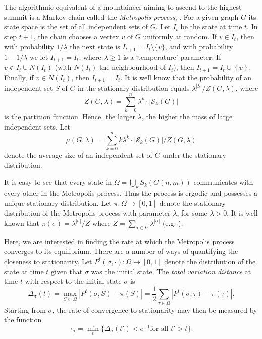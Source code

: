 \documentclass[a4paper,10pt]{article}
\newcommand\cS{\mathcal{S}}
\newcommand\cbc[1]{\left\{{#1}\right\}}
\newcommand\abs[1]{\left|{#1}\right|}
\begin{document}
The algorithmic equivalent of a mountaineer aiming to ascend
to the highest summit is a Markov chain
called the \emph{Metropolis process}, \cite{KirkpatricMetropolis,Metropolis1st}.
For a given graph $G$ its state space is the set of all independent
sets of $G$. Let $I_t$ be the state at time $t$. In step $t+1$, the
chain chooses a vertex $v$ of $G$ uniformly at random. If $v\in I_t$,
then with probability $1/\lambda$ the next state is $I_{t+1}=I_t
\setminus\{v\}$, and with probability $1-1/\lambda$ we let $I_{t+1}
=I_t$, where $\lambda\geq1$ is a `temperature' parameter. If $v\not
\in I_t\cup N(I_t)$ (with $N(I_t)$ the neighbourhood of $I_t$), then
$I_{t+1}=I_t\cup\cbc v$. Finally, if $v\in N(I_t)$, then $I_{t+1}=
I_t$.
It is well know that the probability of an independent set $S$ of $G$ in the stationary
distribution equals $\lambda^{|S|}/Z(G,\lambda)$, where
$$
Z(G,\lambda)=\sum_{k=0}^n \lambda^k\cdot\abs{\cS_k(G)}
$$
is the partition function.
Hence, the larger $\lambda$, the higher the mass of large independent
sets. Let
$$\mu(G,\lambda)=\sum_{k=0}^n k{\lambda}^k\cdot\abs{\cS_k(G)}/Z(G,\lambda)$$
denote the average size of an independent set of $G$ under the
stationary distribution.


It is easy to see that every state in $\Omega=\bigcup_kS_k(G(n,m))$ 
communicates with every other in the Metropolis process.
Thus the process is ergodic and possesses a unique stationary 
distribution. Let $\pi:\Omega\to [0,1]$ denote the stationary 
distribution of the Metropolis process with parameter $\lambda$, 
for some $\lambda>0$. It is well known 
that $\pi(\sigma)={\lambda}^{|\sigma|}/Z$  
where $Z=\sum_{\sigma\in \Omega}\lambda^{|\sigma|}$ (e.g. \cite{jerrum-planted}).  


Here, we are interested in finding the rate at which the Metropolis
process converges to its equilibrium. There are a number of ways
of quantifying the closeness to stationarity. Let $P^t(\sigma,\cdot)
:\Omega\to [0,1]$ denote the distribution of the state at time $t$
given that $\sigma$ was the initial state. The {\em total variation
distance} at time $t$ with respect to the initial state $\sigma$
is 
\begin{displaymath}
\Delta_{\sigma}(t)=\max_{S \subset \Omega}|P^t(\sigma, S)-\pi(S)|=\frac{1}{2}
\sum_{\tau \in \Omega}|P^t(\sigma, \tau)-\pi(\tau)|.
\end{displaymath}
Starting from $\sigma$, the rate of convergence to stationarity may then be measured by the function
\begin{displaymath}
\tau_{\sigma}=\min_t\{\Delta_{\sigma}(t')<e^{-1} \textrm{for all $t'>t$}\}.
\end{displaymath}
\end{document}
